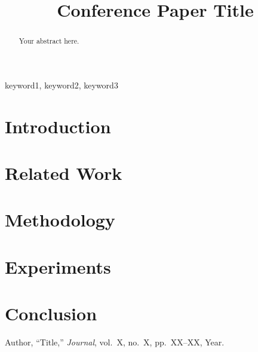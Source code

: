 \documentclass[conference]{IEEEtran}
\title{Conference Paper Title}
\author{
\IEEEauthorblockN{Author One}
\IEEEauthorblockA{Department\\University\\Email}
\and
\IEEEauthorblockN{Author Two}
\IEEEauthorblockA{Department\\University\\Email}
}
\begin{document}
\maketitle

\begin{abstract}

Your abstract here.

\end{abstract}

\begin{IEEEkeywords}
keyword1, keyword2, keyword3
\end{IEEEkeywords}

\section{Introduction}
\label{sec:intro}


\section{Related Work}
\label{sec:related}


\section{Methodology}
\label{sec:method}


\section{Experiments}
\label{sec:experiments}


\section{Conclusion}
\label{sec:conclusion}


\begin{thebibliography}{00}

Author, ``Title,'' \emph{Journal}, vol.~X, no.~X, pp.~XX--XX, Year.

\end{thebibliography}
\end{document}
